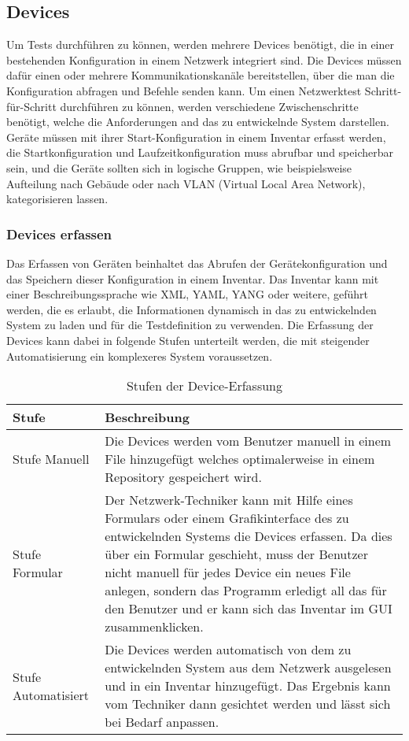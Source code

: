 \documentclass[
	ngerman,
	toc=listof, %
	toc=bibliography, %
	footnotes=multiple, %
	parskip=half, %
	numbers=noendperiod %
]{scrartcl}
\begin{document}
	\subsection{Devices}
	Um Tests durchführen zu können, werden mehrere Devices benötigt, die in einer bestehenden Konfiguration in einem Netzwerk integriert sind.
	Die Devices müssen dafür einen oder mehrere Kommunikationskanäle bereitstellen, über die man die Konfiguration abfragen und Befehle senden kann.
	Um einen Netzwerktest Schritt-für-Schritt durchführen zu können, werden verschiedene Zwischenschritte benötigt, welche die Anforderungen and das zu entwickelnde System darstellen.
	Geräte müssen mit ihrer Start-Konfiguration in einem Inventar erfasst werden, die Startkonfiguration und Laufzeitkonfiguration muss abrufbar und speicherbar sein,
	und die Geräte sollten sich in logische Gruppen, wie beispielsweise Aufteilung nach Gebäude oder nach VLAN (Virtual Local Area Network), kategorisieren lassen.

		\subsubsection{Devices erfassen}
			Das Erfassen von Geräten beinhaltet das Abrufen der Gerätekonfiguration und das Speichern dieser Konfiguration in einem Inventar. 
			Das Inventar kann mit einer Beschreibungssprache wie XML, YAML, YANG oder weitere, geführt werden, die es erlaubt, die Informationen dynamisch in das zu entwickelnden System zu laden und für die Testdefinition zu verwenden.
			Die Erfassung der Devices kann dabei in folgende Stufen unterteilt werden, die mit steigender Automatisierung ein komplexeres System voraussetzen.

			\begin{table}[!h]
				\begin{tabularx}{\textwidth}{lX}
					\toprule
					Stufe & Beschreibung\\
					\midrule
					Stufe Manuell & Die Devices werden vom Benutzer manuell in einem File hinzugefügt welches optimalerweise in einem Repository gespeichert wird. \\
					\midrule
					Stufe Formular & Der Netzwerk-Techniker kann mit Hilfe eines Formulars oder einem Grafikinterface des zu entwickelnden Systems die Devices erfassen. Da dies über ein Formular geschieht, muss der Benutzer nicht manuell für jedes Device ein neues File anlegen, sondern das Programm erledigt all das für den Benutzer und er kann sich das Inventar im GUI zusammenklicken.\\
					\midrule
					Stufe Automatisiert & Die Devices werden automatisch von dem zu entwickelnden System aus dem Netzwerk ausgelesen und in ein Inventar hinzugefügt. Das Ergebnis kann vom Techniker dann gesichtet werden und lässt sich bei Bedarf anpassen. \\
					\bottomrule
				\end{tabularx}
				\caption{Stufen der Device-Erfassung}
			\end{table}
			
\end{document}
